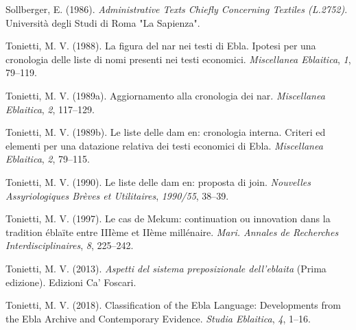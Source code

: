 \documentclass[
]{book}
\newlength{\cslhangindent}
\newlength{\cslentryspacingunit} %
\newenvironment{CSLReferences}[2] %
 {%
  \setlength{\parindent}{0pt}
  \ifodd #1
  \let\oldpar\par
  \def\par{\hangindent=\cslhangindent\oldpar}
  \fi
  \setlength{\parskip}{#2\cslentryspacingunit}
 }%
 {}
\begin{document}
\begin{CSLReferences}{1}{0}
\leavevmode{}%
Sollberger, E. (1986). \emph{Administrative {Texts Chiefly Concerning Textiles} ({L}.2752)}. Universit{à} degli Studi di Roma "La Sapienza".

\leavevmode{}%
Tonietti, M. V. (1988). {La figura del nar nei testi di Ebla. Ipotesi per una cronologia delle liste di nomi presenti nei testi economici}. \emph{Miscellanea Eblaitica}, \emph{1}, 79--119.

\leavevmode{}%
Tonietti, M. V. (1989a). {Aggiornamento alla cronologia dei nar}. \emph{Miscellanea Eblaitica}, \emph{2}, 117--129.

\leavevmode{}%
Tonietti, M. V. (1989b). {Le liste delle dam en: cronologia interna. Criteri ed elementi per una datazione relativa dei testi economici di Ebla}. \emph{Miscellanea Eblaitica}, \emph{2}, 79--115.

\leavevmode{}%
Tonietti, M. V. (1990). {Le liste delle dam en: proposta di join}. \emph{Nouvelles Assyriologiques Br{è}ves et Utilitaires}, \emph{1990/55}, 38--39.

\leavevmode{}%
Tonietti, M. V. (1997). {Le cas de Mekum: continuation ou innovation dans la tradition {é}bla{ï}te entre III{è}me et II{è}me mill{é}naire}. \emph{Mari. Annales de Recherches Interdisciplinaires}, \emph{8}, 225--242.

\leavevmode{}%
Tonietti, M. V. (2013). \emph{{Aspetti del sistema preposizionale dell'eblaita}} (Prima edizione). Edizioni Ca' Foscari.

\leavevmode{}%
Tonietti, M. V. (2018). Classification of the {Ebla Language}: {Developments} from the {Ebla Archive} and {Contemporary Evidence}. \emph{Studia Eblaitica}, \emph{4}, 1--16.

\end{CSLReferences}
\end{document}
